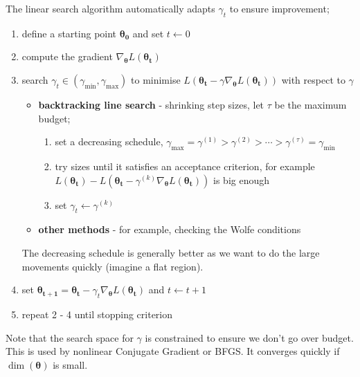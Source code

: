 \documentclass[a4paper, 12pt]{article}
\newcommand{\mat}[1]{\boldsymbol{#1}}
\renewcommand{\vec}[1]{\boldsymbol{#1}}
\begin{document}
\begin{itemize}
                    The linear search algorithm automatically adapts $\gamma_t$ to ensure improvement;
                    \begin{enumerate}
                        \itemsep0em
                        \item define a starting point $\mat{\theta_0}$ and set $t \leftarrow 0$
                        \item compute the gradient $\nabla_{\mat{\theta}}L(\mat{\theta_t})$
                        \item search $\gamma_t \in (\gamma_\text{min}, \gamma_\text{max})$ to minimise $L(\mat{\theta_t} - \gamma\nabla_{\mat{\theta}}L(\mat{\theta_t}))$ with respect to $\gamma$
                            \begin{itemize}
                                \itemsep0em
                                \item \textbf{backtracking line search} - shrinking step sizes, let $\tau$ be the maximum budget;
                                    \begin{enumerate}
                                        \itemsep0em
                                        \item set a decreasing schedule, $\gamma_\text{max} = \gamma^{(1)} > \gamma^{(2)} > \cdots > \gamma^{(\tau)} = \gamma_\text{min}$
                                        \item try sizes until it satisfies an acceptance criterion, for example $L(\mat{\theta_t}) - L(\mat{\theta_t} - \gamma^{(k)}\nabla_{\mat{\theta}}L(\mat{\theta_t}))$ is big enough
                                        \item set $\gamma_t \leftarrow \gamma^{(k)}$
                                    \end{enumerate}
                                \item \textbf{other methods} - for example, checking the Wolfe conditions
                            \end{itemize}
                            The decreasing schedule is generally better as we want to do the large movements quickly (imagine a flat region).
                        \item set $\mat{\theta_{t + 1}} = \mat{\theta_t} - \gamma_t \nabla_{\mat{\theta}}L(\vec{\theta_t})$ and $t \leftarrow t + 1$
                        \item repeat 2 - 4 until stopping criterion
                    \end{enumerate}
                    Note that the search space for $\gamma$ is constrained to ensure we don't go over budget.
                    This is used by nonlinear Conjugate Gradient or BFGS.
                    It converges quickly if $\dim(\mat{\theta})$ is small.
            \end{itemize}
\end{document}
